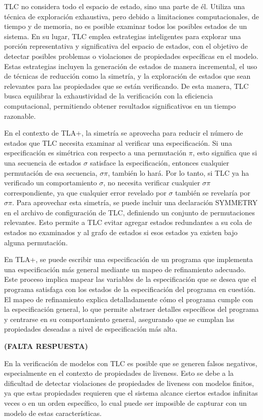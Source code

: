 \documentclass[runningheads]{llncs}
\begin{document}
TLC no considera todo el espacio de estado, sino una parte de él. Utiliza una técnica de exploración exhaustiva, pero debido a limitaciones computacionales, de tiempo y de memoria, no es posible examinar todos los posibles estados de un sistema. En su lugar, TLC emplea estrategias inteligentes para explorar una porción representativa y significativa del espacio de estados, con el objetivo de detectar posibles problemas o violaciones de propiedades específicas en el modelo. Estas estrategias incluyen la generación de estados de manera incremental, el uso de técnicas de reducción como la simetría, y la exploración de estados que sean relevantes para las propiedades que se están verificando. De esta manera, TLC busca equilibrar la exhaustividad de la verificación con la eficiencia computacional, permitiendo obtener resultados significativos en un tiempo razonable.

En el contexto de TLA+, la simetría se aprovecha para reducir el número de estados que TLC necesita examinar al verificar una especificación. Si una especificación es simétrica con respecto a una permutación $\pi$, esto significa que si una secuencia de estados $\sigma$ satisface la especificación, entonces cualquier permutación de esa secuencia, $\sigma\pi$, también lo hará. Por lo tanto, si TLC ya ha verificado un comportamiento $\sigma$, no necesita verificar cualquier $\sigma\pi$ correspondiente, ya que cualquier error revelado por $\sigma$ también se revelaría por $\sigma\pi$.
Para aprovechar esta simetría, se puede incluir una declaración SYMMETRY en el archivo de configuración de TLC, definiendo un conjunto de permutaciones relevantes. Esto permite a TLC evitar agregar estados redundantes a su cola de estados no examinados y al grafo de estados si esos estados ya existen bajo alguna permutación.

En TLA+, se puede escribir una especificación de un programa que implementa una especificación más general mediante un mapeo de refinamiento adecuado. Este proceso implica mapear las variables de la especificación que se desea que el programa satisfaga con los estados de la especificación del programa en cuestión. El mapeo de refinamiento explica detalladamente cómo el programa cumple con la especificación general, lo que permite abstraer detalles específicos del programa y centrarse en su comportamiento general, asegurando que se cumplan las propiedades deseadas a nivel de especificación más alta.

\textbf{(FALTA RESPUESTA)}

En la verificación de modelos con TLC es posible que se generen falsos negativos, especialmente en el contexto de propiedades de liveness. Esto se debe a la dificultad de detectar violaciones de propiedades de liveness con modelos finitos, ya que estas propiedades requieren que el sistema alcance ciertos estados infinitas veces o en un orden específico, lo cual puede ser imposible de capturar con un modelo de estas características.
\end{document}
